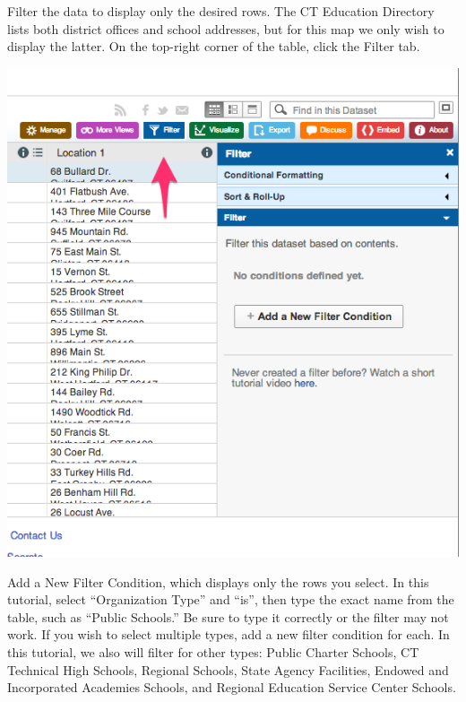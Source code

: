 \documentclass[
  english,
]{book}
\begin{document}
Filter the data to display only the desired rows. The CT Education Directory lists both district offices and school addresses, but for this map we only wish to display the latter. On the top-right corner of the table, click the Filter tab.

\includegraphics{images/06-map/SocrataMap3.png}

Add a New Filter Condition, which displays only the rows you select. In this tutorial, select ``Organization Type'' and ``is'', then type the exact name from the table, such as ``Public Schools.'' Be sure to type it correctly or the filter may not work. If you wish to select multiple types, add a new filter condition for each. In this tutorial, we also will filter for other types: Public Charter Schools, CT Technical High Schools, Regional Schools, State Agency Facilities, Endowed and Incorporated Academies Schools, and Regional Education Service Center Schools.
\end{document}
